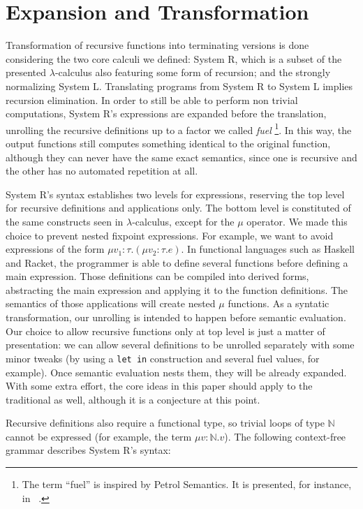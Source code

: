 \documentclass[runningheads]{llncs}
\newcommand{\tN}{\mathbb{N}}
\begin{document}
\section{Expansion and Transformation}
Transformation of recursive functions into 
terminating versions is done considering the two core 
calculi we defined: System R, which is a subset of 
the presented $\lambda$-calculus also featuring 
some form of recursion; and the strongly 
normalizing System L. Translating programs from 
System R to System L implies recursion 
elimination. In order to still be able to perform non 
trivial computations, System R's expressions are 
expanded before 
the translation, unrolling the recursive 
definitions up to a factor we called \textit{fuel}
\footnote{The term ``fuel'' is inspired by Petrol 
Semantics. It is presented, for instance, in ~\cite{mcbride2015turing}.}.
In this way, the output functions still computes 
something identical to the original function, 
although they can never have the same exact 
semantics, since one is recursive and the other has no 
automated repetition at all.

System R's syntax establishes two levels for expressions, 
reserving the top level for recursive definitions 
and applications only. The bottom level is 
constituted of the same constructs seen in 
$\lambda$-calculus, except for the $\mu$ operator.
We made this choice to prevent nested fixpoint 
expressions. For example, we want to avoid expressions 
of the form $\mu v_1 : \tau . (\mu v_2 : \tau . e)$.
In functional languages such as Haskell and Racket, the 
programmer  
is able to define several functions before defining a 
main expression. Those definitions can be compiled into 
derived forms, abstracting the main expression and 
applying it to the function definitions. The semantics 
of those applications will create nested $\mu$ functions. 
As a syntatic transformation, our 
unrolling is intended to happen before semantic 
evaluation. Our choice to allow recursive functions 
only at top level is just a matter of presentation: 
we can allow several 
definitions to be unrolled separately with some minor 
tweaks 
(by using a {\tt let in} construction and several fuel values, for example). Once semantic evaluation nests 
them, they will be already expanded. With some extra 
effort, the core ideas in this paper should apply to 
the traditional \stlc as well, although it is a conjecture 
at this point.

Recursive definitions also require a functional 
type, so trivial loops of type $\tN$ cannot be 
expressed (for example, the term $\mu v : \tN . v$).
The following context-free grammar 
describes System R's syntax:
\end{document}
